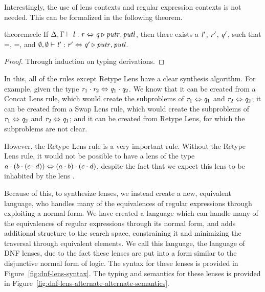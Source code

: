 Interestingly, the use of lens contexts and regular expression contexts
is not needed.
This can be formalized in the following theorem.
\begin{restatable}{theorem}{eclc}
\label{thm:empty-context-lens-completeness}
If $\Delta, \Gamma \vdash \mathit{l} : \mathit{r} \Leftrightarrow \mathit{q} \triangleright \mathit{putr},\mathit{putl}$,
then there exists a $\mathit{l}'$, $\mathit{r}'$, $\mathit{q}'$, such that
\LanguageOf{\RegexContext}{\Regex}=,
\LanguageOf{\RegexContext}{\RegexAlt}=, and
$\emptyset,\emptyset \vdash \mathit{l}' : \mathit{r}' \Leftrightarrow \mathit{q}' \triangleright \mathit{putr},\mathit{putl}$.
\end{restatable}
\begin{proof}
Through induction on typing derivations.
\end{proof}

In this, all of the rules except Retype Lens have a clear synthesis algorithm.
For example, given the type $\mathit{r}_1\cdot\mathit{r}_2\Leftrightarrow\mathit{q}_1\cdot\mathit{q}_2$.
We know that it can be created from a Concat Lens rule,
which would create the subproblems of $\mathit{r}_1\Leftrightarrow\mathit{q}_1$ and $\mathit{r}_2\Leftrightarrow\mathit{q}_2$;
it can be created from a Swap Lens rule, which would create the subproblems of $\mathit{r}_1\Leftrightarrow\mathit{q}_2$ and $\mathit{r}_2\Leftrightarrow\mathit{q}_1$;
and it can be created from Retype Lens, for which the subproblems are not clear.

However, the Retype Lens rule is a very important rule.
Without the Retype Lens rule, it would not be possible to have a lens of the type
$a\cdot (b\cdot (c\cdot d))\Leftrightarrow(a\cdot b)\cdot(c\cdot d)$,
despite the fact that we expect this lens to be inhabited by the lens \IdentityLens{}.




Because of this, to synthesize lenses, we instead create a new, equivalent language,
who handles many of the equivalences of regular expressions through exploiting a normal form.
We have created a language which can handle many of the equivalences of regular
expressions through its normal form, and adds additional structure to the search
space, constraining it and minimizing the traversal through equivalent elements.
We call this language, the language of DNF lenses, due to the fact these lenses are
put into a form similar to the disjunctive normal form of logic.
The syntax for these lenses is provided in Figure~\ref{fig:dnf-lens-syntax}.
The typing and semantics for these lenses is provided in Figure~\ref{fig:dnf-lens-alternate-alternate-semantics}.

